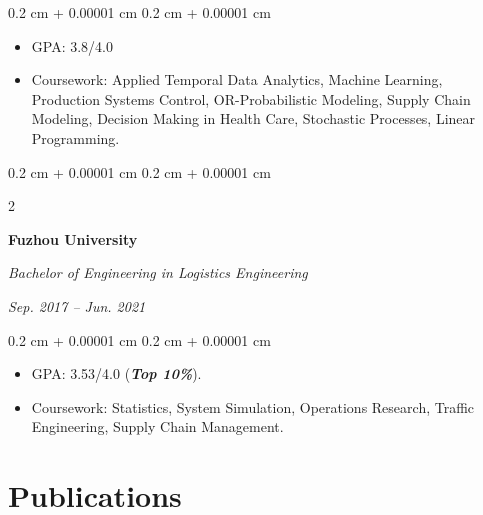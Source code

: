 \documentclass[10pt, letterpaper]{article}
\newenvironment{highlights}{
    \begin{itemize}[
        topsep=0.10 cm,
        parsep=0.10 cm,
        partopsep=0pt,
        itemsep=0pt,
        leftmargin=0.4 cm + 10pt
    ]
}{
    \end{itemize}
} %
\newenvironment{onecolentry}{
    \begin{adjustwidth}{
        0.2 cm + 0.00001 cm
    }{
        0.2 cm + 0.00001 cm
    }
}{
    \end{adjustwidth}
} %
\newenvironment{twocolentry}[2][]{
    \onecolentry
    \def\secondColumn{#2}
    \setcolumnwidth{\fill, 4.5 cm}
    \begin{paracol}{2}
}{
    \switchcolumn \raggedleft \secondColumn
    \end{paracol}
    \endonecolentry
} %
\begin{document}
\vspace{0.10 cm}
\begin{onecolentry}
    \begin{highlights}
        \item GPA: 3.8/4.0
        \item Coursework: Applied Temporal Data Analytics, Machine Learning, Production Systems Control, OR-Probabilistic Modeling, Supply Chain Modeling, Decision Making in Health Care, Stochastic Processes, Linear Programming.
    \end{highlights}
\end{onecolentry}

\vspace{0.13 cm}

\begin{twocolentry}{
    \textit{Sep. 2017 – Jun. 2021}}
    \textbf{Fuzhou University}

    \vspace{0.10 cm}
    \textit{Bachelor of Engineering in Logistics Engineering}
\end{twocolentry}

\vspace{0.10 cm}
\begin{onecolentry}
    \begin{highlights}
        \item GPA: 3.53/4.0 (\textit{\textbf{Top 10\%}}).
        \item Coursework: Statistics, System Simulation, Operations Research, Traffic Engineering, Supply Chain Management.
    \end{highlights}
\end{onecolentry}




\section{Publications}

\vspace{0.13 cm}
\end{document}

